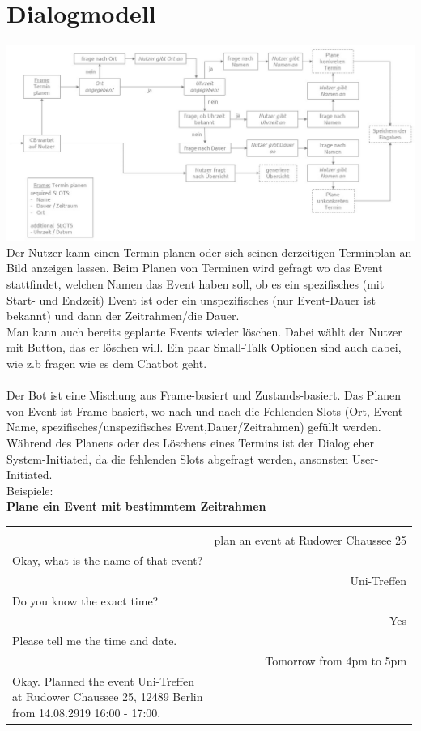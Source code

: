 \chapter{Dialogmodell}

\includegraphics[width=\linewidth]{Dialogmodell_bild}\\
Der Nutzer kann einen Termin planen oder sich seinen derzeitigen Terminplan an Bild anzeigen lassen. Beim Planen von Terminen wird gefragt wo das Event stattfindet, welchen Namen das Event haben soll, ob es ein spezifisches (mit Start- und Endzeit) Event ist oder ein unspezifisches (nur Event-Dauer ist bekannt) und dann der Zeitrahmen/die Dauer.\\
Man kann auch bereits geplante Events wieder löschen. Dabei wählt der Nutzer mit Button, das er löschen will. 
Ein paar Small-Talk Optionen sind auch dabei, wie z.b fragen wie es dem Chatbot geht.\\\\
Der Bot ist eine Mischung aus Frame-basiert und Zustands-basiert. Das Planen von Event ist Frame-basiert, wo nach und nach die Fehlenden Slots (Ort, Event Name, spezifisches/unspezifisches Event,Dauer/Zeitrahmen) gefüllt werden. 
Während des Planens oder des Löschens eines Termins ist der Dialog eher System-Initiated, da die fehlenden Slots abgefragt werden, ansonsten User-Initiated.\\

\newpage
Beispiele:\\ 

\textbf{Plane ein Event mit bestimmtem Zeitrahmen}\\

\begin{framed}
\begin{tabular}{lr}
	\makecell[c]{JANUS} & \makecell[c]{USER} \\
 & plan an event at Rudower Chaussee 25 \\
Okay, what is the name of that event? & \\
 & Uni-Treffen\\
Do you know the exact time? & \\
 & Yes\\
Please tell me the time and date. & \\
 & Tomorrow from 4pm to 5pm\\
 \makecell[l]{Okay. Planned the event Uni-Treffen \\ at Rudower Chaussee 25, 12489 Berlin \\ from 14.08.2919 16:00 - 17:00.}
 \end{tabular}
\end{framed}

